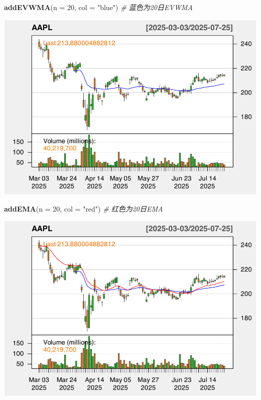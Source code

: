 \documentclass[]{ctexbook}
\newenvironment{Shaded}{\begin{snugshade}}{\end{snugshade}}
\newcommand{\AttributeTok}[1]{\textcolor[rgb]{0.13,0.29,0.53}{#1}}
\newcommand{\CommentTok}[1]{\textcolor[rgb]{0.56,0.35,0.01}{\textit{#1}}}
\newcommand{\DecValTok}[1]{\textcolor[rgb]{0.00,0.00,0.81}{#1}}
\newcommand{\FunctionTok}[1]{\textcolor[rgb]{0.13,0.29,0.53}{\textbf{#1}}}
\newcommand{\NormalTok}[1]{#1}
\newcommand{\StringTok}[1]{\textcolor[rgb]{0.31,0.60,0.02}{#1}}
\begin{document}
\begin{Shaded}
\begin{Highlighting}[]
\FunctionTok{addEVWMA}\NormalTok{(}\AttributeTok{n =} \DecValTok{20}\NormalTok{, }\AttributeTok{col =} \StringTok{"blue"}\NormalTok{)   }\CommentTok{\# 蓝色为20日EVWMA}
\end{Highlighting}
\end{Shaded}

\includegraphics[width=0.9\linewidth]{QuantmodHandbook_files/figure-latex/evwma-2}

\begin{Shaded}
\begin{Highlighting}[]
\FunctionTok{addEMA}\NormalTok{(}\AttributeTok{n =} \DecValTok{20}\NormalTok{, }\AttributeTok{col =} \StringTok{"red"}\NormalTok{)      }\CommentTok{\# 红色为20日EMA}
\end{Highlighting}
\end{Shaded}

\includegraphics[width=0.9\linewidth]{QuantmodHandbook_files/figure-latex/evwma-3}
\end{document}
